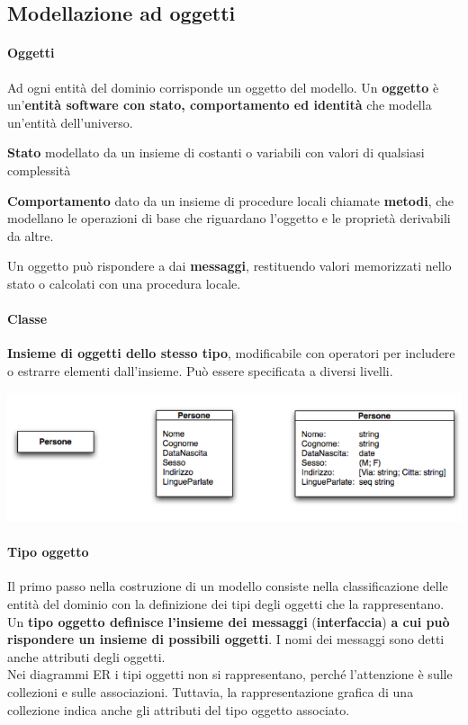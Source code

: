 \documentclass[10pt]{book}
\begin{document}
\subsection{Modellazione ad oggetti}
\paragraph{Oggetti} Ad ogni entità del dominio corrisponde un oggetto del modello. Un \textbf{oggetto} è un'\textbf{entità software con stato, comportamento ed identità} che modella un'entità dell'universo.
\begin{list}{}{}
	\item \textbf{Stato} modellato da un insieme di costanti o variabili con valori di qualsiasi complessità
	\item \textbf{Comportamento} dato da un insieme di procedure locali chiamate \textbf{metodi}, che modellano le operazioni di base che riguardano l'oggetto e le proprietà derivabili da altre.
	\item Un oggetto può rispondere a dai \textbf{messaggi}, restituendo valori memorizzati nello stato o calcolati con una procedura locale.
\end{list}
\paragraph{Classe} \textbf{Insieme di oggetti dello stesso tipo}, modificabile con operatori per includere o estrarre elementi dall'insieme. Può essere specificata a diversi livelli.
\begin{center}
	\includegraphics[scale=0.75]{classspec.png}
\end{center}
\paragraph{Tipo oggetto} Il primo passo nella costruzione di un modello consiste nella classificazione delle entità del dominio con la definizione dei tipi degli oggetti che la rappresentano.\\
Un \textbf{tipo oggetto definisce l'insieme dei messaggi} (\textbf{interfaccia}) \textbf{a cui può rispondere un insieme di possibili oggetti}. I nomi dei messaggi sono detti anche attributi degli oggetti.\\
Nei diagrammi ER i tipi oggetti non si rappresentano, perché l'attenzione è sulle collezioni e sulle associazioni. Tuttavia, la rappresentazione grafica di una collezione indica anche gli attributi del tipo oggetto associato.
\end{document}
